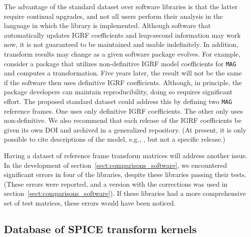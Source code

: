 \documentclass[draft]{agujournal2019}
\begin{document}

The advantage of the standard dataset over software libraries is that the latter require continual upgrades, and not all users perform their analysis in the language in which the library is implemented. Although software that automatically updates IGRF coefficients and leap-second information may work now, it is not guaranteed to be maintained and usable indefinitely. In addition, transform results may change as a given software package evolves. For example, consider a package that utilizes non-definitive IGRF model coefficients for \texttt{MAG} and computes a transformation. Five years later, the result will not be the same if the software then uses definitive IGRF coefficients. Although, in principle, the package developers can maintain reproducibility, doing so requires significant effort. The proposed standard dataset could address this by defining two \texttt{MAG} reference frames. One uses only definitive IGRF coefficients. The other only uses non-definitive. We also recommend that each release of the IGRF coefficients be given its own DOI and archived in a generalized repository. (At present, it is only possible to cite descriptions of the model, e.g., , but not a specific release.)


Having a dataset of reference frame transform matrices will address another issue. In the development of section~\ref{sect:comparisons_software}, we encountered significant errors in four of the libraries, despite these libraries passing their tests. (These errors were reported, and a version with the corrections was used in section~\ref{sect:comparisons_software}). If these libraries had a more comprehensive set of test matrices, these errors would have been noticed.



\subsection{Database of SPICE transform kernels}
\end{document}
